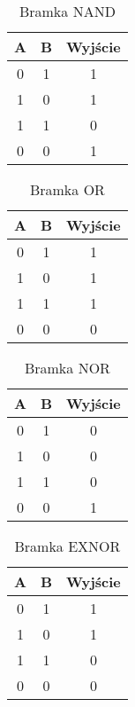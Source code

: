 \documentclass[11pt,a4paper]{article}
\begin{document}
\begin{table}[h]
\centering\caption*{Bramka NAND}
\begin{tabular}{|c|c|c|}
\hline
A & B & Wyjście\\
\hline
0 & 1 & 1\\
\hline
1 & 0 & 1\\
\hline
1 & 1 & 0\\
\hline
0 & 0 & 1\\
\hline
\end{tabular}	
\end{table}

\begin{table}[h]
\centering\caption*{Bramka OR}
\begin{tabular}{|c|c|c|}
\hline
A & B & Wyjście\\
\hline
0 & 1 & 1\\
\hline
1 & 0 & 1\\
\hline
1 & 1 & 1\\
\hline
0 & 0 & 0\\
\hline
\end{tabular}	
\end{table}

\begin{table}[h]
\centering\caption*{Bramka NOR}
\begin{tabular}{|c|c|c|}
\hline
A & B & Wyjście\\
\hline
0 & 1 & 0\\
\hline
1 & 0 & 0\\
\hline
1 & 1 & 0\\
\hline
0 & 0 & 1\\
\hline
\end{tabular}	
\end{table}

\begin{table}[h]
\centering\caption*{Bramka EXNOR}
\begin{tabular}{|c|c|c|}
\hline
A & B & Wyjście\\
\hline
0 & 1 & 1\\
\hline
1 & 0 & 1\\
\hline
1 & 1 & 0\\
\hline
0 & 0 & 0\\
\hline
\end{tabular}	
\end{table}
\end{document}
